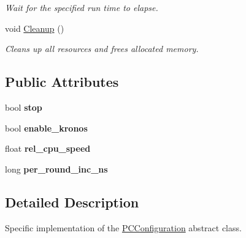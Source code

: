 \begin{DoxyCompactItemize}
\begin{DoxyCompactList}\small\item\em Wait for the specified run time to elapse. \end{DoxyCompactList}\item 
void \hyperlink{classpc__emulator_1_1PCConfigurationImpl_a15dff3a523e1aac72268a30cfb2edf02}{Cleanup} ()\hypertarget{classpc__emulator_1_1PCConfigurationImpl_a15dff3a523e1aac72268a30cfb2edf02}{}\label{classpc__emulator_1_1PCConfigurationImpl_a15dff3a523e1aac72268a30cfb2edf02}

\begin{DoxyCompactList}\small\item\em Cleans up all resources and frees allocated memory. \end{DoxyCompactList}\end{DoxyCompactItemize}
\subsection*{Public Attributes}
\begin{DoxyCompactItemize}
\item 
bool {\bfseries stop}\hypertarget{classpc__emulator_1_1PCConfigurationImpl_a5fa854b73309ce8c8a1c91e385a65c34}{}\label{classpc__emulator_1_1PCConfigurationImpl_a5fa854b73309ce8c8a1c91e385a65c34}

\item 
bool {\bfseries enable\+\_\+kronos}\hypertarget{classpc__emulator_1_1PCConfigurationImpl_a32a79edc91700f5c8f14a548fb02167f}{}\label{classpc__emulator_1_1PCConfigurationImpl_a32a79edc91700f5c8f14a548fb02167f}

\item 
float {\bfseries rel\+\_\+cpu\+\_\+speed}\hypertarget{classpc__emulator_1_1PCConfigurationImpl_ad0c39af31f210109df318e77a9dbab14}{}\label{classpc__emulator_1_1PCConfigurationImpl_ad0c39af31f210109df318e77a9dbab14}

\item 
long {\bfseries per\+\_\+round\+\_\+inc\+\_\+ns}\hypertarget{classpc__emulator_1_1PCConfigurationImpl_a760b0e1484136ef12687deee70d25987}{}\label{classpc__emulator_1_1PCConfigurationImpl_a760b0e1484136ef12687deee70d25987}

\end{DoxyCompactItemize}


\subsection{Detailed Description}
Specific implementation of the \hyperlink{classpc__emulator_1_1PCConfiguration}{P\+C\+Configuration} abstract class. 

